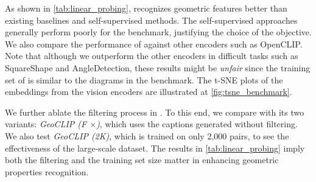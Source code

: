 As shown in \cref{tab:linear_probing}, \geoclip{} recognizes geometric features better than existing baselines and self-supervised methods. The self-supervised approaches generally perform poorly for the benchmark, justifying the choice of the objective. We also compare the performance of \geoclip{} against other encoders such as OpenCLIP. Note that although we outperform the other encoders in difficult tasks such as SquareShape and AngleDetection, these results might be \emph{unfair} since the training set of \geoclip{} is similar to the diagrams in the benchmark.
The t-SNE plots of the embeddings from the vision encoders are illustrated at \cref{fig:tsne_benchmark}.

We further ablate the filtering process in \geoclip{}. To this end, we compare \geoclip{} with its two variants: \emph{GeoCLIP (F $\times$)}, which uses the captions generated without filtering. We also test \emph{GeoCLIP (2K)}, which is trained on only 2,000 pairs, to see the effectiveness of the large-scale dataset.
The results in \cref{tab:linear_probing} imply both the filtering and the training set size matter in enhancing geometric properties recognition.





